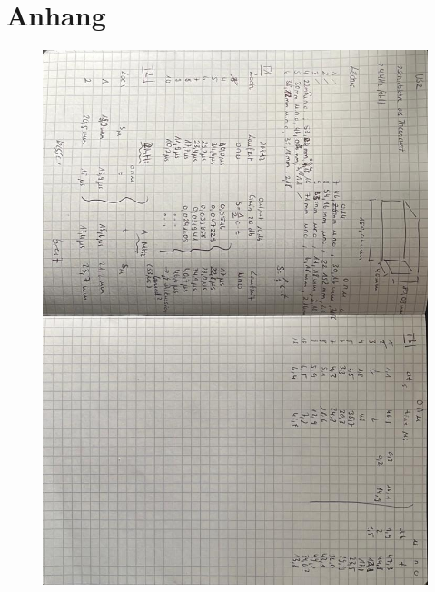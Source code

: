 \section{Anhang}

\begin{figure}[H]
    \centering
    \includegraphics[width=140mm]{bilder/Anhang.jpeg}
\end{figure}
